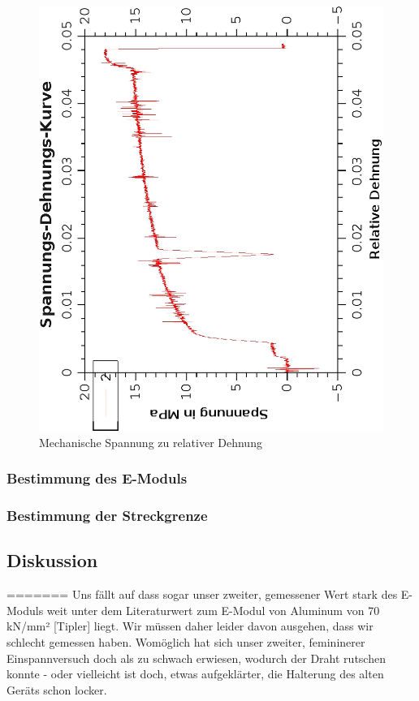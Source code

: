 \documentclass{article}
\begin{document}
\begin{center}
\begin{figure}
\caption{Mechanische Spannung zu relativer Dehnung}
\includegraphics[scale=0.7,angle=-90]{spannungsdehnungskurve.eps}
\end{figure}
\end{center}
\subsubsection*{Bestimmung des E-Moduls}
\subsubsection*{Bestimmung der Streckgrenze}
\subsection{Diskussion}
\newpage
=======
Uns fällt auf dass sogar unser zweiter, gemessener Wert stark des E-Moduls weit unter dem
Literaturwert zum E-Modul von Aluminum von 70 kN/mm² [Tipler] liegt. Wir müssen daher leider davon ausgehen, dass wir schlecht gemessen haben. Womöglich hat sich unser zweiter, femininerer Einspannversuch doch als zu schwach erwiesen, wodurch der Draht rutschen konnte - oder vielleicht ist doch, etwas aufgeklärter, die Halterung des alten Geräts schon locker.
\end{document}
